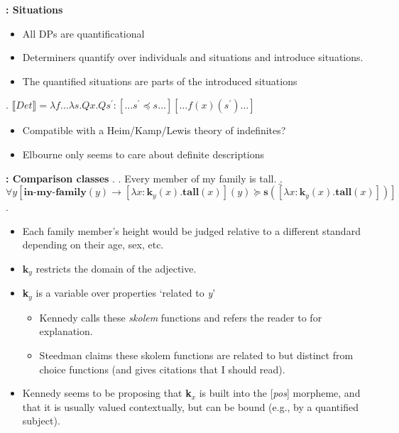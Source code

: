 \documentclass[letterpaper,12pt]{article}
\begin{document}
\textbf{\textcite{elbourne2005situations}: Situations}
\begin{itemize}
  \item All DPs are quantificational
  \item Determiners quantify over individuals and situations and introduce situations.
  \item The quantified situations are parts of the introduced situations
\end{itemize}
\ex. $\llbracket Det \rrbracket = \lambda f \dots \lambda s.Qx.Qs^\prime:[\dots s^\prime\preceq s \dots][\dots f(x)(s^\prime)\dots]$

\begin{itemize}
  \item Compatible with a Heim/Kamp/Lewis theory of indefinites?
  \item Elbourne only seems to care about definite descriptions
\end{itemize}
\textbf{\textcite{kennedy2007vagueness}: Comparison classes}
\ex.
\a. Every member of my family is tall.
\b. $\forall y[\textbf{in-my-family}(y) \longrightarrow [\lambda x:\textbf{k}_y(x).\textbf{tall}(x)](y)\succeq \textbf{s}([\lambda x:\textbf{k}_y(x).\textbf{tall}(x)]) ]$
\z.

\begin{itemize}
  \item Each family member's height would be judged relative to a different standard depending on their age, sex, etc.
  \item $\textbf{k}_y$ restricts the domain of the adjective.
  \item \textbf{k}$_y$ is a variable over properties `related to \textit{y}'
    \begin{itemize}
      \item Kennedy calls these \textit{skolem} functions and refers the reader to \textcite{steedman2000process} for explanation.
      \item Steedman claims these skolem functions are related to but distinct from choice functions (and gives citations that I should read).
    \end{itemize}
  \item Kennedy seems to be proposing that \textbf{k}$_x$ is built into the [\textit{pos}] morpheme, and that it is usually valued contextually, but can be bound (e.g., by a quantified subject).
\end{itemize}
\end{document}
